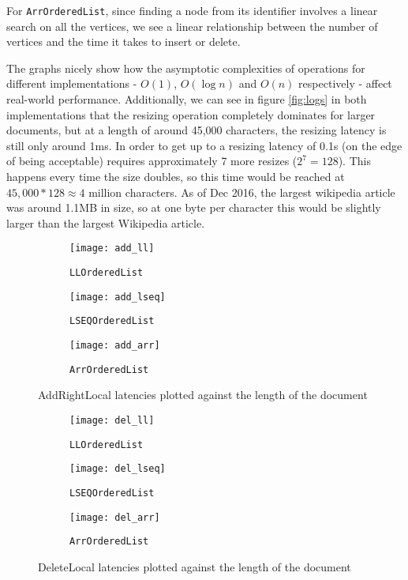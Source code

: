 \documentclass[diss.tex]{subfiles}
\begin{document}
For \texttt{ArrOrderedList}, since finding a node from its identifier involves a linear search on all the vertices, we see a linear relationship between the number of vertices and the time it takes to insert or delete.

The graphs nicely show how the asymptotic complexities of operations for different implementations - $O(1)$, $O(\log n)$ and $O(n)$ respectively - affect real-world performance. Additionally, we can see in figure \ref{fig:logs} in both implementations that the resizing operation completely dominates for larger documents, but at a length of around 45,000 characters, the resizing latency is still only around 1ms. In order to get up to a resizing latency of 0.1s (on the edge of being acceptable) requires approximately 7 more resizes ($2^7=128$). This happens every time the size doubles, so this time would be reached at $45,000 * 128 \approx 4$ million characters. As of Dec 2016, the largest wikipedia article was around 1.1MB in size, so at one byte per character this would be slightly larger than the largest Wikipedia article.


%
%
\begin{figure}[H]
\vspace{-3cm}
\begin{subfigure}{\linewidth}
\centering
\texttt{[image: add\_ll]}
\caption{\texttt{LLOrderedList}}
\label{fig:add_ll}
\end{subfigure}

\begin{subfigure}{\linewidth}
\centering
\texttt{[image: add\_lseq]}
\caption{\texttt{LSEQOrderedList}}
\label{fig:add_lseq}
\end{subfigure}

\begin{subfigure}{\linewidth}
\centering
\texttt{[image: add\_arr]}
\caption{\texttt{ArrOrderedList}}
\label{fig:add_arr}
\end{subfigure}
\caption{AddRightLocal latencies plotted against the length of the document} 
\label{fig:add_latencies}
\end{figure}
%
%
%
%
%
%
\begin{figure}
\vspace{-3cm}
\begin{subfigure}{\linewidth}
\centering
\texttt{[image: del\_ll]}
\caption{\texttt{LLOrderedList}}
\label{fig:del_ll}
\end{subfigure}

\begin{subfigure}{\linewidth}
\centering
\texttt{[image: del\_lseq]}
\caption{\texttt{LSEQOrderedList}}
\label{fig:del_lseq}
\end{subfigure}

\begin{subfigure}{\linewidth}
\centering
\texttt{[image: del\_arr]}
\caption{\texttt{ArrOrderedList}}
\label{fig:del_arr}
\end{subfigure}
%
\caption{DeleteLocal latencies plotted against the length of the document} 
\label{fig:del_latencies}
\end{figure}
\end{document}
